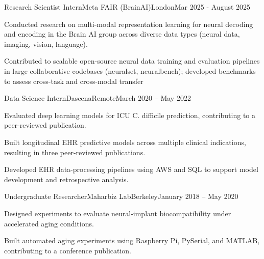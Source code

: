 \begin{joblong}{Research Scientist Intern}{Meta FAIR (BrainAI)}{London}{Mar 2025 - August 2025}
\item Conducted research on multi-modal representation learning for neural decoding and encoding in the Brain AI group across diverse data types (neural data, imaging, vision, language).
\item Contributed to scalable open-source neural data training and evaluation pipelines in large collaborative codebases (neuralset, neuralbench); developed benchmarks to assess cross-task and cross-modal transfer
\end{joblong}



\begin{joblong}{Data Science Intern}{Dascena}{Remote}{March 2020 -- May 2022}
    \item Evaluated deep learning models for ICU C. difficile prediction, contributing to a peer-reviewed publication.
    \item Built longitudinal EHR predictive models across multiple clinical indications, resulting in three peer-reviewed publications.
    \item Developed EHR data-processing pipelines using AWS and SQL to support model development and retrospective analysis.
\end{joblong}


\begin{joblong}{Undergraduate Researcher}{Maharbiz Lab}{Berkeley}{January 2018 -- May 2020}
    \item Designed experiments to evaluate neural-implant biocompatibility under accelerated aging conditions.
    \item Built automated aging experiments using Raspberry Pi, PySerial, and MATLAB, contributing to a conference publication.
\end{joblong}

